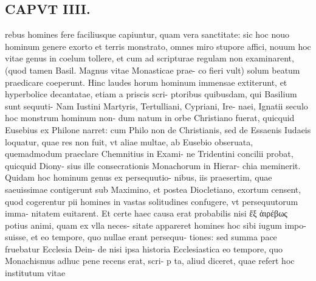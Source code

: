 \documentclass{article}
\begin{document}
\begin{pages}
\section*{CAPVT  IIII. }
\marginpar{[ p.215 ]}\pstart rebus homines fere faciliusque capiuntur, quam vera sanctitate: sic hoc nouo hominum genere exorto et terris monstrato, omnes miro stupore affici, nouum hoc vitae genus in coelum tollere, et cum ad scripturae regulam non examinarent, (quod tamen Basil. Magnus vitae Monasticae prae- co fieri vult) solum beatum praedicare coeperunt. Hinc laudes horum hominum immensae extiterunt, et hyperbolice decantatae, etiam a priscis scri- ptoribus quibusdam, qui Basilium sunt sequuti- Nam Iustini Martyris, Tertulliani, Cypriani, Ire- naei, Ignatii seculo hoc monstrum hominum non- dum natum in orbe Christiano fuerat, quicquid Eusebius ex Philone narret: cum Philo non de Christianis, sed de Essaenis Iudaeis loquatur, quae res non fuit, vt aliae multae, ab Eusebio obseruata, quemadmodum praeclare Chemnitius in Exami- ne Tridentini concilii probat, quicquid Diony- sius ille consecrationis Monachorum in Hierar- chia meminerit. Quidam hoc hominum genus ex persequutio- nibus, iis praesertim, quae saeuissimae contigerunt sub Maximino, et postea Diocletiano, exortum censent, quod cogerentur pii homines in vastas solitudines confugere, vt persequutorum imma- nitatem euitarent. Et certe haec causa erat probabilis nisi ἔξ ἀιρέβως potius animi, quam ex vlla neces- sitate appareret homines hoc sibi iugum impo- suisse, et eo tempore, quo nullae erant persequu- tiones: sed summa pace fruebatur Ecclesia Dein- de nisi ipsa historia Ecclesiastica eo tempore, quo Monachismus adhuc pene recens erat, scri- p ta, aliud diceret, quae refert hoc institutum vitae  \pend

\end{pages}
\end{document}

